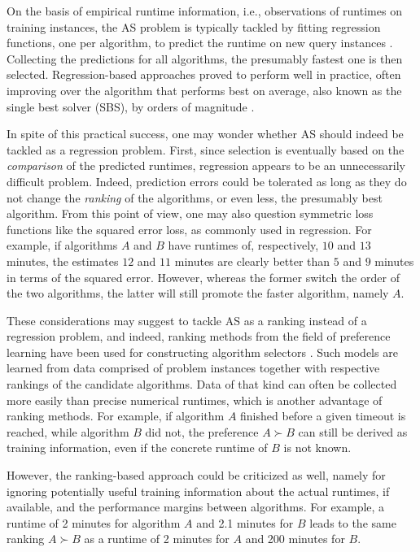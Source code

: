 \documentclass[runningheads]{llncs}
\begin{document}
On the basis of empirical runtime information, i.e., observations of runtimes on training instances, the AS problem is typically tackled by fitting regression functions, one per algorithm, to predict the runtime on new query instances \cite{friedman1991multivariate,xu2008satzilla}.
Collecting the predictions for all algorithms, the presumably fastest one is then selected.
Regression-based approaches proved to perform well in practice, often improving 
over the algorithm that performs best on average, also known as the single best 
solver (SBS), by orders of magnitude \cite{xu2008satzilla}. 

In spite of this practical success, one may wonder whether AS should indeed be tackled as a regression problem. First, since selection is eventually based on the \emph{comparison} of the predicted runtimes, regression appears to be an unnecessarily difficult problem.
Indeed, prediction errors could be tolerated as long as they do not change the \emph{ranking} of the algorithms, or even less, the presumably best algorithm. From this point of view, one may also question symmetric loss functions like the squared error loss, as commonly used in regression. For example, if algorithms $A$ and $B$ have runtimes of, respectively, $10$ and $13$ minutes, the estimates $12$ and $11$ minutes are clearly better than $5$ and $9$ minutes in terms of the squared error. However, whereas the former switch the order of the two algorithms, the latter will still promote the faster algorithm, namely $A$. 
 
These considerations may suggest to tackle AS as a ranking instead of a regression problem, and indeed, ranking methods from the field of preference learning have  been used for constructing algorithm selectors \cite{cunha2018label,saSKC17,kanda2012meta,tornede2019algorithm,tornedeWHextreme20}. Such models are learned from data comprised of problem instances together with respective rankings of the candidate algorithms. Data of that kind can often be collected more easily than precise numerical runtimes, which is another advantage of ranking methods. For example, if algorithm $A$ finished before a given timeout is reached, while algorithm $B$ did not, the preference $A \succ B$ can still be derived as training information, even if the concrete runtime of $B$ is not known.

However, the ranking-based approach could be criticized as well, namely for ignoring potentially useful training information about the actual runtimes, if available, and the performance margins between algorithms. For example, a runtime of 2 minutes for algorithm $A$ and 2.1 minutes for $B$ leads to the same ranking $A \succ B$ as a runtime of 2 minutes for $A$ and 200 minutes for $B$.  
\end{document}
